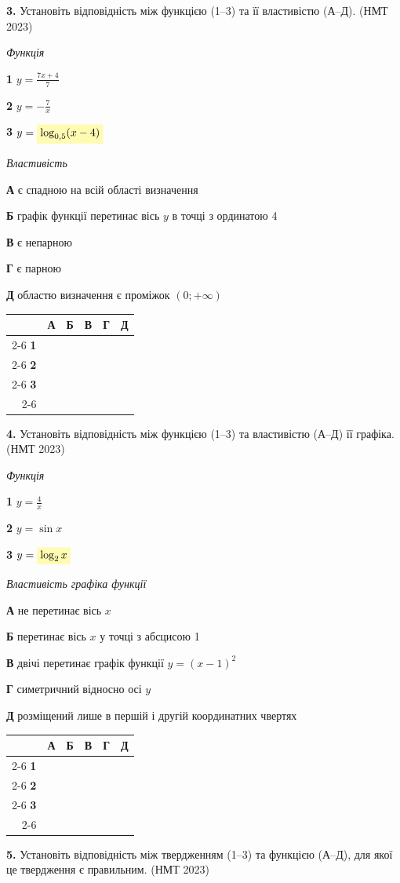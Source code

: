 \documentclass[14pt]{extarticle}
\newcommand{\answerGridSmall}{
    \begingroup
    \renewcommand{\arraystretch}{1.2} 
    \setlength{\tabcolsep}{5pt} 
    \begin{tabular}{r|c|c|c|c|c|}
         \multicolumn{1}{c}{} & \multicolumn{1}{c}{\textbf{А}} & \multicolumn{1}{c}{\textbf{Б}} & \multicolumn{1}{c}{\textbf{В}} & \multicolumn{1}{c}{\textbf{Г}} & \multicolumn{1}{c}{\textbf{Д}} \\ \cline{2-6}
         \textbf{1} & & & & & \\ \cline{2-6}
         \textbf{2} & & & & & \\ \cline{2-6}
         \textbf{3} & & & & & \\ \cline{2-6}
    \end{tabular}
    \endgroup
}
\newcommand{\matchingLayoutBottom}[2]{
    \noindent
    \begin{minipage}[t]{0.48\textwidth}
        #1
    \end{minipage}%
    \hfill
    \begin{minipage}[t]{0.48\textwidth}
        #2
    \end{minipage}
    
    \vspace{0.5cm}
    
    \noindent
    \answerGridSmall
}
\newcommand{\nmtyear}[1]{\hfill{\small\color{yearcolor}(НМТ #1)}}
\begin{document}
\vspace{1cm}

\noindent\textbf{3.} Установіть відповідність між функцією (1--3) та її властивістю (А--Д). \nmtyear{2023}
\vspace{0.3cm}

\matchingLayoutBottom{\textit{Функція}

\textbf{1} \quad $y = \displaystyle\frac{7x + 4}{7}$

\textbf{2} \quad $y = -\displaystyle\frac{7}{x}$

\textbf{3} \quad $y = \colorbox{yellow!30}{$\log_{0,5} (x - 4)$}$
}{
\textit{Властивість}

\textbf{А} \quad є спадною на всій області визначення

\textbf{Б} \quad графік функції перетинає вісь $y$ в точці з ординатою 4

\textbf{В} \quad є непарною

\textbf{Г} \quad є парною

\textbf{Д} \quad областю визначення є проміжок $(0; +\infty)$
}

\vspace{1cm}

\noindent\textbf{4.} Установіть відповідність між функцією (1--3) та властивістю (А--Д) її графіка. \nmtyear{2023}
\vspace{0.3cm}

\matchingLayoutBottom{\textit{Функція}

\textbf{1} \quad $y = \displaystyle\frac{4}{x}$

\textbf{2} \quad $y = \sin x$

\textbf{3} \quad $y = \colorbox{yellow!30}{$\log_2 x$}$
}{
\textit{Властивість графіка функції}

\textbf{А} \quad не перетинає вісь $x$

\textbf{Б} \quad перетинає вісь $x$ у точці з абсцисою 1

\textbf{В} \quad двічі перетинає графік функції $y = (x - 1)^2$

\textbf{Г} \quad симетричний відносно осі $y$

\textbf{Д} \quad розміщений лише в першій і другій координатних чвертях
}

\vspace{1cm}

\noindent\textbf{5.} Установіть відповідність між твердженням (1--3) та функцією (А--Д), для якої це твердження є правильним. \nmtyear{2023}
\vspace{0.3cm}
\end{document}
